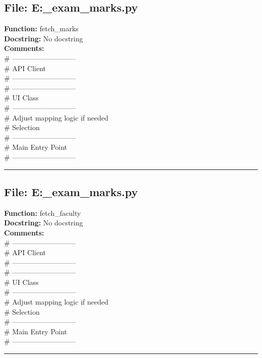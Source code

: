 {\subsection*{File: E:\project\capstone\frontend\faculty\mst_exam_marks.py}
\textbf{Function:} fetch_marks\\
\textbf{Docstring:} No docstring\\
\textbf{Comments:}\\
# ---------------------------\\
# API Client\\
# ---------------------------\\
# ---------------------------\\
# UI Class\\
# ---------------------------\\
# Adjust mapping logic if needed\\
# Selection\\
# ---------------------------\\
# Main Entry Point\\
# ---------------------------\\

\hrule

\subsection*{File: E:\project\capstone\frontend\faculty\mst_exam_marks.py}
\textbf{Function:} fetch_faculty\\
\textbf{Docstring:} No docstring\\
\textbf{Comments:}\\
# ---------------------------\\
# API Client\\
# ---------------------------\\
# ---------------------------\\
# UI Class\\
# ---------------------------\\
# Adjust mapping logic if needed\\
# Selection\\
# ---------------------------\\
# Main Entry Point\\
# ---------------------------\\

\hrule

}
